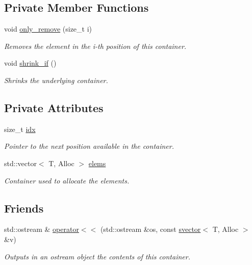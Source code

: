 \subsection*{Private Member Functions}
\begin{DoxyCompactItemize}
\item 
void \hyperlink{classlgraph_1_1utils_1_1svector_afd0bed68cf8eb4c07c8553c555fb2f3b}{only\-\_\-remove} (size\-\_\-t i)
\begin{DoxyCompactList}\small\item\em Removes the element in the i-\/th position of this container. \end{DoxyCompactList}\item 
void \hyperlink{classlgraph_1_1utils_1_1svector_af9d5e3d01e8cf40b13494d699a7f2eef}{shrink\-\_\-if} ()
\begin{DoxyCompactList}\small\item\em Shrinks the underlying container. \end{DoxyCompactList}\end{DoxyCompactItemize}
\subsection*{Private Attributes}
\begin{DoxyCompactItemize}
\item 
size\-\_\-t \hyperlink{classlgraph_1_1utils_1_1svector_a7ef963c079c7dc8a6a559ceef81a241f}{idx}
\begin{DoxyCompactList}\small\item\em Pointer to the next position available in the container. \end{DoxyCompactList}\item 
std\-::vector$<$ T, Alloc $>$ \hyperlink{classlgraph_1_1utils_1_1svector_aa72e9ffeb58f88d3cb01671e3e672a45}{elems}
\begin{DoxyCompactList}\small\item\em Container used to allocate the elements. \end{DoxyCompactList}\end{DoxyCompactItemize}
\subsection*{Friends}
\begin{DoxyCompactItemize}
\item 
std\-::ostream \& \hyperlink{classlgraph_1_1utils_1_1svector_a0917cbb972bd75239a20e86164b5f7b6}{operator$<$$<$} (std\-::ostream \&os, const \hyperlink{classlgraph_1_1utils_1_1svector}{svector}$<$ T, Alloc $>$ \&v)
\begin{DoxyCompactList}\small\item\em Outputs in an ostream object the contents of this container. \end{DoxyCompactList}\end{DoxyCompactItemize}


